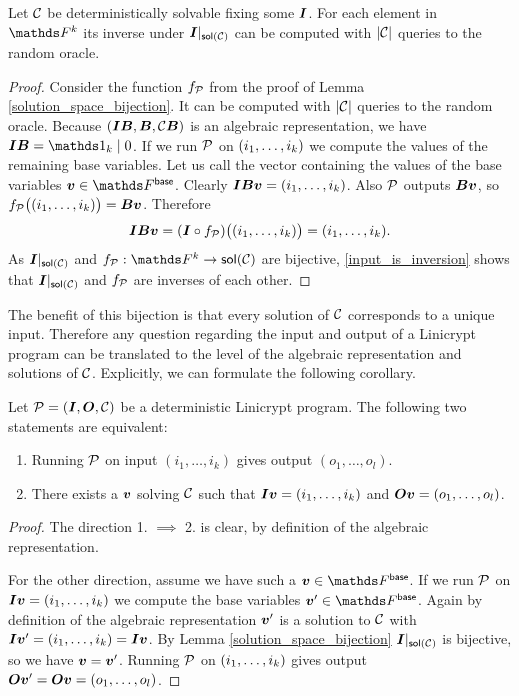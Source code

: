 \begin{corollary}
\label{det_solvable_computeable}
    Let $\C$ be deterministically solvable fixing some $\I$.
    For each element in $\F^k$ its inverse under $\I|_{\sol(\C)}$ can be computed with $|\C|$ queries to the random oracle.
\end{corollary}

\begin{proof}
    Consider the function $f_\P$ from the proof of Lemma \ref{solution_space_bijection}.
    It can be computed with $|\C|$ queries to the random oracle.
    Because $(\I\B, \B, \C\B)$ is an algebraic representation,
    we have $\I\B = \Id_k \mid 0$. 
    If we run $\P$ on $(\dts i k)$ we compute the values of the remaining base variables.
    Let us call the vector containing the values of the base variables $\vv \in \Fsp$.
    Clearly $\I\B \vv = (\dts i k)$.
    Also $\P$ outputs $\B\vv$, so $f_\P\big((\dts i k)\big) = \B\vv$. 
    Therefore 
    \begin{equation}
    \label{input_is_inversion}
    \I\B \vv = (\I \circ f_\P)\big((\dts i k)\big) = (\dts i k).
    \end{equation}
    As $\I|_{\sol(\C)}$ and $f_\P: \F^k \to \sol(\C)$ are bijective,
    \eqref{input_is_inversion} shows that $\I|_{\sol(\C)}$ and $f_\P$ are inverses of each other.
\end{proof}

The benefit of this bijection is that every solution of $\C$ corresponds to a unique input.
Therefore any question regarding the input and output of a Linicrypt program can be translated to the level of the algebraic representation and solutions of $\C$.
Explicitly, we can formulate the following corollary.

\begin{corollary}
\label{det_solvable_equiv}
    Let $\P = (\I, \O, \C)$ be a deterministic Linicrypt program.
    The following two statements are equivalent:
    \begin{enumerate}
    \item
        Running $\P$ on input $(i_1, \dots, i_k)$ gives output $(o_1, \dots, o_l)$.
    \item 
        There exists a $\vv$ solving $\C$ such that
        $\I\vv = (\dts i k)$ and
        $\O\vv = (\dts o l)$.
    \end{enumerate}
\end{corollary}

\begin{proof}
    The direction 1. $\implies$ 2. is clear, by definition of the algebraic representation.
    
    For the other direction, assume we have such a $\vv \in \Base$.
    If we run $\P$ on $\I\vv = (\dts i k)$ we compute the base variables $\vv' \in \Base$.
    Again by definition of the algebraic representation $\vv'$ is a solution to $\C$ with $\I\vv' = (\dts i k) = \I\vv$.
    By Lemma \ref{solution_space_bijection} $\I|_{\sol(\C)}$ is bijective,
    so we have $\vv = \vv'$.
    Running $\P$ on $(\dts i k)$ gives output $\O\vv' = \O\vv = (\dts o l)$.
\end{proof}


